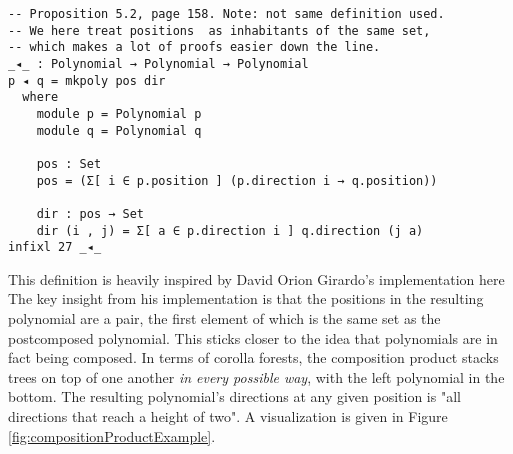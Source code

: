 \begin{verbatim}
-- Proposition 5.2, page 158. Note: not same definition used. 
-- We here treat positions  as inhabitants of the same set, 
-- which makes a lot of proofs easier down the line.
_◂_ : Polynomial → Polynomial → Polynomial
p ◂ q = mkpoly pos dir
  where
    module p = Polynomial p
    module q = Polynomial q

    pos : Set
    pos = (Σ[ i ∈ p.position ] (p.direction i → q.position))

    dir : pos → Set
    dir (i , j) = Σ[ a ∈ p.direction i ] q.direction (j a)
infixl 27 _◂_
\end{verbatim}

This definition is heavily inspired by David Orion Girardo's implementation here \cite{daig} The key insight from his implementation is that the positions in the resulting polynomial are a pair, the first element of which is the same set as the postcomposed polynomial. This sticks closer to the idea that polynomials are in fact being composed. In terms of corolla forests, the composition product stacks trees on top of one another \textit{in every possible way}, with the left polynomial in the bottom. The resulting polynomial's directions at any given position is "all directions that reach a height of two". A visualization is given in Figure \ref{fig:compositionProductExample}.

